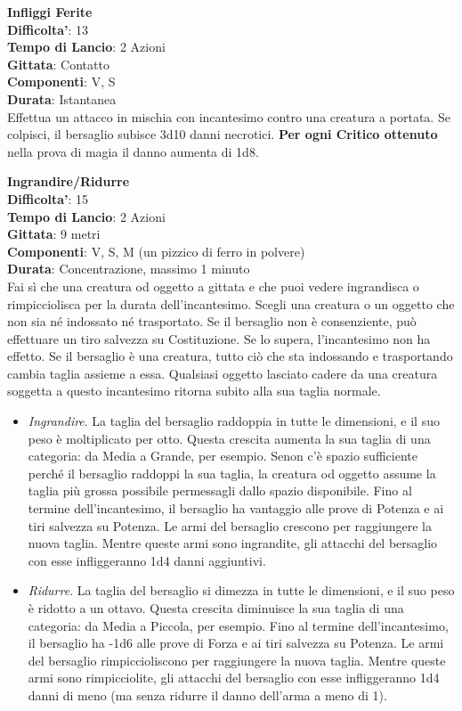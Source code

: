 \begin{multicols}{2}
\medskip\textbf{Infliggi Ferite}\\
\textbf{Difficolta'}: 13 \\
\textbf{Tempo di Lancio}: 2 Azioni\\
\textbf{Gittata}: Contatto\\
\textbf{Componenti}: V, S\\
\textbf{Durata}: Istantanea\\
Effettua un attacco in mischia con incantesimo contro una creatura a portata. Se colpisci, il bersaglio subisce 3d10 danni necrotici.
\textbf{Per ogni Critico ottenuto} nella prova di magia il danno aumenta di 1d8.

\medskip\textbf{Ingrandire/Ridurre}\\
\textbf{Difficolta'}: 15\\
\textbf{Tempo di Lancio}: 2 Azioni\\
\textbf{Gittata}: 9 metri\\
\textbf{Componenti}: V, S, M (un pizzico di ferro in polvere)\\
\textbf{Durata}: Concentrazione, massimo 1 minuto\\
Fai sì che una creatura od oggetto a gittata e che puoi vedere ingrandisca o rimpicciolisca per la durata dell’incantesimo. Scegli una creatura o un oggetto che non sia né indossato né trasportato. Se il bersaglio non è consenziente, può effettuare un tiro salvezza su Costituzione. Se lo supera, l’incantesimo non ha effetto. Se il bersaglio è una creatura, tutto ciò che sta indossando e trasportando cambia taglia assieme a essa. Qualsiasi oggetto lasciato cadere da una creatura soggetta a questo incantesimo ritorna subito alla sua taglia normale.\\
\medskip
\begin{itemize}
\item
\textit{Ingrandire}. La taglia del bersaglio raddoppia in tutte le dimensioni, e il suo peso è moltiplicato per otto. Questa crescita aumenta la sua taglia di una categoria: da Media a Grande, per esempio. Senon c’è spazio  sufficiente perché il bersaglio raddoppi la sua taglia, la creatura od oggetto assume la taglia più grossa possibile permessagli dallo spazio disponibile. Fino al termine dell’incantesimo, il bersaglio ha vantaggio alle prove di Potenza e ai tiri salvezza su Potenza. Le armi del bersaglio crescono per raggiungere la nuova taglia. Mentre queste armi sono ingrandite, gli attacchi del bersaglio con esse infliggeranno 1d4 danni aggiuntivi. 
\item
\textit{Ridurre}. La taglia del bersaglio si dimezza in tutte le dimensioni, e il suo peso è ridotto a un ottavo. Questa crescita diminuisce la sua taglia di una categoria: da Media a Piccola, per esempio. Fino al termine dell’incantesimo, il bersaglio ha -1d6 alle prove di Forza e ai tiri salvezza su Potenza. Le armi del bersaglio rimpiccioliscono per raggiungere la nuova taglia. Mentre queste armi sono rimpicciolite, gli attacchi del bersaglio con esse infliggeranno 1d4 danni di meno (ma senza ridurre il danno dell’arma a meno di 1).
\end{itemize}


\end{multicols}
